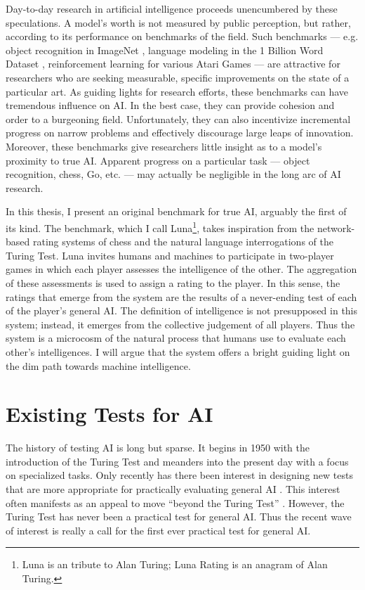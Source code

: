 Day-to-day research in artificial intelligence proceeds unencumbered by these speculations. A model's worth is not measured by public perception, but rather, according to its performance on benchmarks of the field. Such benchmarks --- e.g. object recognition in ImageNet \cite{russakovsky2015imagenet}, language modeling in the 1 Billion Word Dataset \cite{chelba2013one}, reinforcement learning for various Atari Games\cite{mnih2013playing} --- are attractive for researchers who are seeking measurable, specific improvements on the state of a particular art. As guiding lights for research efforts, these benchmarks can have tremendous influence on AI. In the best case, they can provide cohesion and order to a burgeoning field. Unfortunately, they can also incentivize incremental progress on narrow problems and effectively discourage large leaps of innovation\cite{shieber2015}. Moreover, these benchmarks give researchers little insight as to a model's proximity to true AI. Apparent progress on a particular task --- object recognition, chess, Go, etc. --- may actually be negligible in the long arc of AI research.

In this thesis, I present an original benchmark for true AI, arguably the first of its kind. The benchmark, which I call Luna\footnote{Luna is an tribute to Alan Turing; Luna Rating is an anagram of Alan Turing.}, takes inspiration from the network-based rating systems of chess and the natural language interrogations of the Turing Test. Luna invites humans and machines to participate in two-player games in which each player assesses the intelligence of the other. The aggregation of these assessments is used to assign a rating to the player. In this sense, the ratings that emerge from the system are the results of a never-ending test of each of the player's general AI. The definition of intelligence is not presupposed in this system; instead, it emerges from the collective judgement of all players. Thus the system is a microcosm of the natural process that humans use to evaluate each other's intelligences. I will argue that the system offers a bright guiding light on the dim path towards machine intelligence.

\section{Existing Tests for AI}

The history of testing AI is long but sparse. It begins in 1950 with the introduction of the Turing Test and meanders into the present day with a focus on specialized tasks. Only recently has there been interest in designing new tests that are more appropriate for practically evaluating general AI \cite{you2015beyond}. This interest often manifests as an appeal to move ``beyond the Turing Test'' \cite{1_the_newyorker_2015}. However, the Turing Test has never been a practical test for general AI. Thus the recent wave of interest is really a call for the first ever practical test for general AI.


